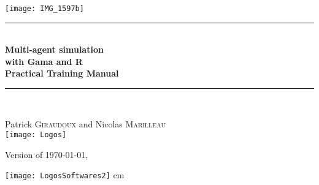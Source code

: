 \documentclass[a4paper,12pt]{book}
\makeatletter
\def\cleardoublepage{\clearpage\if@twoside \ifodd\c@page\else%
  \hbox{}%
  \thispagestyle{empty}%
  \newpage%
  \if@twocolumn\hbox{}\newpage\fi\fi\fi}
\makeatother
\begin{document}

\begin{titlepage}
\begin{center}

\texttt{[image: IMG\_1597b]}\\[0.5cm]


\rule{\linewidth}{0.5mm} \\[0.3cm]
{ \huge \bfseries Multi-agent simulation\\with Gama and R \\[0.3cm]
\Large Practical Training Manual}\\[0.3cm]
\rule{\linewidth}{0.5mm} \\[0.5cm]


\noindent

\large Patrick \textsc{Giraudoux} and  Nicolas \textsc{Marilleau}\\[0.5cm]

\texttt{[image: Logos]}\\[0.5cm]

\vfill

{\small Version of \today, \currenttime}


\end{center}
\end{titlepage}


\frontmatter


\clearpage




\vspace*{\fill}

\begin{center}
\texttt{[image: LogosSoftwares2]}
 cm
	\color{red}
\end{center}
\vfill

\tableofcontents



\mainmatter
\pagestyle{fancy}

\cleardoublepage



%





\clearpage
\end{document}
